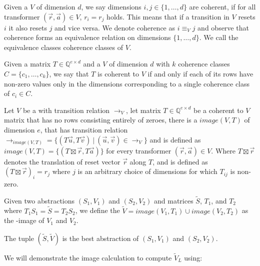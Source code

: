 \begin{mydef}
	Given a \qvasr $V$ of dimension $d$, we say dimensions $i, j \in \{1, \ldots, d\}$ are coherent, if for all transformer $(\vec{r}, \vec{a}) \in V$, $r_i = r_j$ holds. This means that if a transition in $V$ resets $i$ it also resets $j$ and vice versa. We denote coherence as $i \equiv_V j$ and observe that coherence forms an equivalence relation on dimensions $\{1, \ldots, d\}$. We call the equivalence classes coherence classes of $V$.
\end{mydef}
Given a matrix $T \in \mathbb{Q}^{e \times d}$ and a \qvasr $V$ of dimension $d$ with $k$ coherence classes $C = \{c_1, \ldots, c_k\}$, we say that $T$ is coherent to $V$ if and only if each of its rows have non-zero values only in the dimensions corresponding to a single coherence class of $c_i \in C$. \\ \par
Let $V$ be a \qvasr with transition relation $\rightarrow_V$, let matrix  $T \in \mathbb{Q}^{e \times d}$ be a coherent to $V$ matrix that has no rows consisting entirely of zeroes, there is a \qvasr $image(V, T)$ of dimension $e$, that has transition relation $\rightarrow_{image(V, T)} = \{(T\vec{u}, T\vec{v})\ |\ (\vec{u}, \vec{v}) \in\rightarrow_V \}$ and is defined as $image(V, T) = \{(T\boxtimes\vec{r}, T\vec{a})\}$ for every transformer $(\vec{r}, \vec{a}) \in V$. Where $T\boxtimes\vec{r}$ denotes the translation of reset vector $\vec{r}$ along $T$, and is defined as $(T\boxtimes\vec{r})_i = r_j$ where $j$ is an arbitrary choice of dimensions for which $T_{ij}$ is non-zero. \\ \par
\begin{mydef}
Given two \qvasr abstractions $(S_1, V_1)$ and $(S_2, V_2)$ and matrices $\tilde{S}$, $T_1$, and $T_2$ where $T_1S_1 = \tilde{S} = T_2S_2$, we define the \qvasr $\tilde{V} = image(V_1, T_1) \cup image(V_2, T_2)$ as the \qvasr-image of $V_1$ and $V_2$.
\end{mydef}
The tuple $(\tilde{S}, \tilde{V})$ is the best \qvasr abstraction of $(S_1, V_1)$ and $(S_2, V_2)$. \\ \par
We will demonstrate the image calculation to compute \qvasr $\tilde{V}_L$ using:
